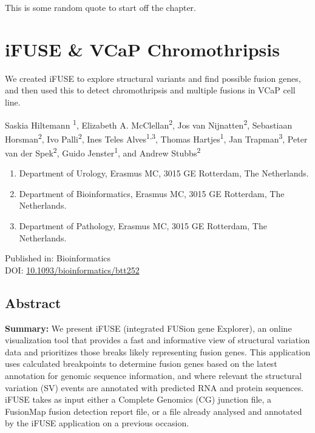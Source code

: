 \begin{savequote}[75mm]
This is some random quote to start off the chapter.
\end{savequote}

\chapter{iFUSE \& VCaP Chromothripsis}
\setcounter{figure}{-1}
\setcounter{table}{-1}
\setcounter{section}{-1}

We created iFUSE to explore structural variants and find possible fusion genes, and then used this to detect chromothripsis and multiple fusions in VCaP cell line.

%
\newpage
{}
Saskia Hiltemann \textsuperscript{1}, Elizabeth A. McClellan\textsuperscript{2}, Jos van Nijnatten\textsuperscript{2}, Sebastiaan Horsman\textsuperscript{2}, Ivo Palli\textsuperscript{2}, Ines Teles Alves\textsuperscript{1,3}, Thomas Hartjes\textsuperscript{1}, Jan Trapman\textsuperscript{3}, Peter van der Spek\textsuperscript{2}, Guido Jenster\textsuperscript{1}, and Andrew Stubbs\textsuperscript{2}

\small
\begin{enumerate}
\itemsep-0.5em
\item Department of Urology, Erasmus MC, 3015 GE Rotterdam, The Netherlands.
\item Department of Bioinformatics, Erasmus MC, 3015 GE Rotterdam, The Netherlands.
\item Department of Pathology, Erasmus MC, 3015 GE Rotterdam, The Netherlands.
\end{enumerate}

Published in: Bioinformatics \\
DOI: \url{10.1093/bioinformatics/btt252} \\

\section*{Abstract}

\textbf{Summary:} We present iFUSE (integrated FUSion gene Explorer), an online visualization tool that provides a fast and informative view of structural variation data and prioritizes those breaks likely representing fusion genes. \color{black} This application uses calculated breakpoints to determine fusion genes based on the latest annotation for genomic sequence information, and where relevant the structural variation (SV) events are annotated with predicted RNA and protein sequences. iFUSE takes as input either a Complete Genomics (CG) junction file, a FusionMap \cite{fusionmap} fusion detection report file, or a file already analysed and annotated by the iFUSE application on a previous occasion.

